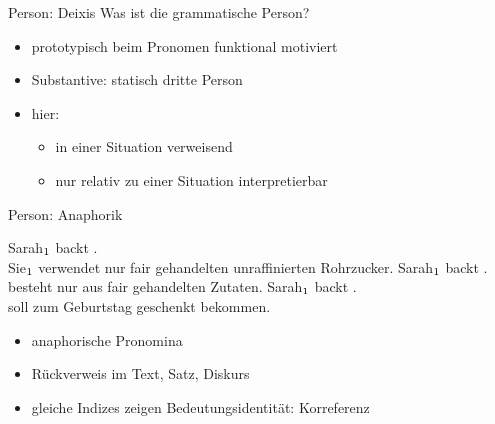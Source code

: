 \begin{frame}
  {Person: Deixis}
  \pause
  Was ist die grammatische Person?

  \Halbzeile
  \pause
  \begin{exe}
    \ex
    \begin{xlist}
      \pause
      \pause
      \pause
    \end{xlist}
  \end{exe}
  \pause
  \Halbzeile
  \begin{itemize}[<+->]
    \item prototypisch beim \alert{Pronomen} funktional motiviert
    \item Substantive: statisch dritte Person
      \Halbzeile
    \item hier: 
      \begin{itemize}[<+->]
        \item in einer Situation verweisend
        \item nur relativ zu einer Situation interpretierbar
      \end{itemize} 
  \end{itemize}
\end{frame}

\begin{frame}
  {Person: Anaphorik}
  \pause
  \begin{exe}
    \ex \alert{Sarah$_{\textnormal{1}}$} backt  .\\
      \alert{Sie$_{\textnormal{1}}$} verwendet nur fair gehandelten unraffinierten Rohrzucker.
    \pause
      \ex \alert{Sarah$_{\textnormal{1}}$} backt  .\\
       besteht nur aus fair gehandelten Zutaten.
    \pause
      \ex \alert{Sarah$_{\textnormal{1}}$} backt  .\\
       soll  zum Geburtstag geschenkt bekommen.
  \end{exe}
  \Halbzeile
  \pause
  \begin{itemize}[<+->]
    \item anaphorische Pronomina
    \item Rückverweis im Text, Satz, Diskurs
    \item gleiche Indizes zeigen Bedeutungsidentität: Korreferenz
  \end{itemize}
\end{frame}

